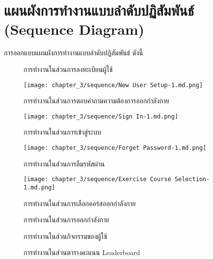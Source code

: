 \section{แผนผังการทำงานแบบลำดับปฏิสัมพันธ์ (Sequence Diagram)}
การออกแบบแผนผังการทำงานแบบลำดับปฏิสัมพันธ์ ดังนี้

\begin{figure}
    \caption{การทำงานในส่วนการลงทะเบียนผู้ใช้}
\end{figure}

\begin{figure}
    \texttt{[image: chapter\_3/sequence/New User Setup-1.md.png]}
    \caption{การทำงานในส่วนการตอบคำถามความต้องการออกกำลังกาย}
\end{figure}

\begin{figure}
    \texttt{[image: chapter\_3/sequence/Sign In-1.md.png]}
    \caption{การทำงานในส่วนการเข้าสู่ระบบ}
\end{figure}

\begin{figure}
    \texttt{[image: chapter\_3/sequence/Forget Password-1.md.png]}
    \caption{การทำงานในส่วนการลืมรหัสผ่าน}
\end{figure}

\begin{figure}
    \texttt{[image: chapter\_3/sequence/Exercise Course Selection-1.md.png]}
    \caption{การทำงานในส่วนการเลือกคอร์สออกกำลังกาย}
\end{figure}

\begin{figure}
    \caption{การทำงานในส่วนการออกกำลังกาย}
\end{figure}

\begin{figure}
    \caption{การทำงานในส่วนกิจกรรมของผู้ใช้}
\end{figure}

\begin{figure}
    \caption{การทำงานในส่วนตารางคะแนน Leaderboard}
\end{figure}

